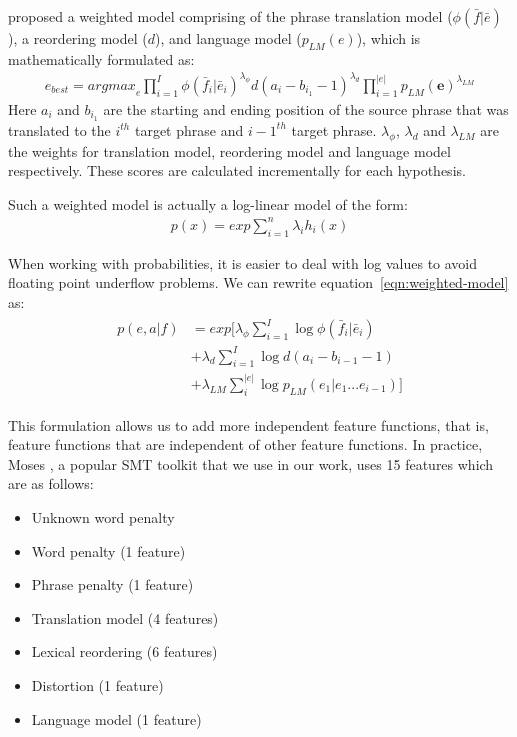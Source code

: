 \cite{Koehn2003} proposed a weighted model comprising of the phrase translation model ($\phi(\bar{f}|\bar{e})$), a reordering model ($d$), and language model ($p_{LM}(e)$), which is mathematically formulated as:
\begin{eqnarray}\label{eqn:weighted-model}
	e_{best} = {argmax}_e \prod_{i=1}^{I} \phi(\bar{f}_i|\bar{e}_i)^{\lambda_\phi} d(a_i - b_{i_1} -1)^{\lambda_d} \prod_{i=1}^{|e|}p_{LM}(\textbf{e})^{\lambda_{LM}}
\end{eqnarray}
Here $a_i$ and $b_{i_1}$ are the starting and ending position of the source phrase that was translated to the $i^{th}$ target phrase and ${i-1}^{th}$ target phrase. $\lambda_\phi$, $\lambda_d$ and $\lambda_{LM}$ are the weights for translation model, reordering model and language model respectively. These scores are calculated incrementally for each hypothesis.

Such a weighted model is actually a log-linear model of the form:
\begin{eqnarray}
	p(x) = exp \sum_{i=1}^{n}\lambda_ih_i(x)
\end{eqnarray}

When working with probabilities, it is easier to deal with log values to avoid floating point underflow problems. We can rewrite equation~\ref{eqn:weighted-model} as:
\begin{eqnarray}
	\begin{aligned}
		p(e, a|f)& = exp \big[\lambda_\phi \sum_{i=1}^{I}\log\phi(\bar{f}_i|\bar{e}_i) \\
		& + \lambda_d \sum_{i=1}^{I}\log d(a_i - b_{i-1} -1) \\
		& + \lambda_{LM} \sum_{i}^{|e|} \log p_{LM}(e_1 | e_1 ... e_{i-1})]
	\end{aligned}
\end{eqnarray}

This formulation allows us to add more independent feature functions, that is, feature functions that are independent of other feature functions. In practice, Moses \cite{Koehn2007Moses}, a popular SMT toolkit that we use in our work, uses 15 features which are as follows:
\begin{itemize}
	\item Unknown word penalty
	\item Word penalty (1 feature)
	\item Phrase penalty (1 feature)
	\item Translation model (4 features)
	\item Lexical reordering (6 features)
	\item Distortion (1 feature)
	\item Language model (1 feature)
\end{itemize}


